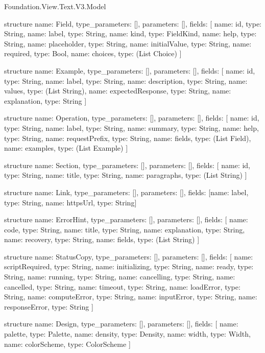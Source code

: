 \begin{lexlean}{Foundation.View.Text.V3.Model}
\begin{semanticmodule}
structure{
  name: Field,
  type_parameters: [],
  parameters: [],
  fields: [
    {name: id, type: String},
    {name: label, type: String},
    {name: kind, type: FieldKind},
    {name: help, type: String},
    {name: placeholder, type: String},
    {name: initialValue, type: String},
    {name: required, type: Bool},
    {name: choices, type: (List Choice)}
  ]
}

structure{
  name: Example,
  type_parameters: [],
  parameters: [],
  fields: [
    {name: id, type: String},
    {name: label, type: String},
    {name: description, type: String},
    {name: values, type: (List String)},
    {name: expectedResponse, type: String},
    {name: explanation, type: String}
  ]
}

structure{
  name: Operation,
  type_parameters: [],
  parameters: [],
  fields: [
    {name: id, type: String},
    {name: label, type: String},
    {name: summary, type: String},
    {name: help, type: String},
    {name: requestPrefix, type: String},
    {name: fields, type: (List Field)},
    {name: examples, type: (List Example)}
  ]
}

structure{
  name: Section,
  type_parameters: [],
  parameters: [],
  fields: [
    {name: id, type: String},
    {name: title, type: String},
    {name: paragraphs, type: (List String)}
  ]
}

structure{
  name: Link,
  type_parameters: [],
  parameters: [],
  fields: [{name: label, type: String}, {name: httpsUrl, type: String}]
}

structure{
  name: ErrorHint,
  type_parameters: [],
  parameters: [],
  fields: [
    {name: code, type: String},
    {name: title, type: String},
    {name: explanation, type: String},
    {name: recovery, type: String},
    {name: fields, type: (List String)}
  ]
}

structure{
  name: StatusCopy,
  type_parameters: [],
  parameters: [],
  fields: [
    {name: scriptRequired, type: String},
    {name: initializing, type: String},
    {name: ready, type: String},
    {name: running, type: String},
    {name: cancelling, type: String},
    {name: cancelled, type: String},
    {name: timeout, type: String},
    {name: loadError, type: String},
    {name: computeError, type: String},
    {name: inputError, type: String},
    {name: responseError, type: String}
  ]
}

structure{
  name: Design,
  type_parameters: [],
  parameters: [],
  fields: [
    {name: palette, type: Palette},
    {name: density, type: Density},
    {name: width, type: Width},
    {name: colorScheme, type: ColorScheme}
  ]
}


\end{semanticmodule}
\end{lexlean}
